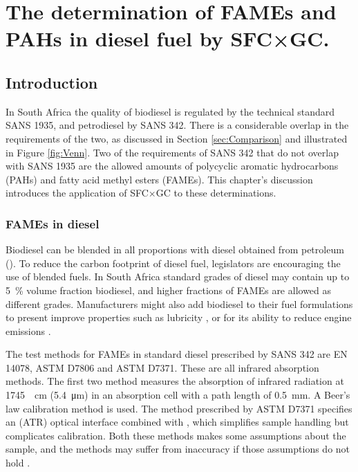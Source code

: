 
\begin{savequote}[\quotewidth]

\end{savequote}

\chapter{The determination of FAMEs and PAHs in diesel fuel by SFC×GC.} %
\label{Chapter7} %

\section{Introduction}

In South Africa the quality of biodiesel is regulated by the technical standard
SANS 1935, and petrodiesel by SANS 342. There is a considerable overlap in the
requirements of the two, as discussed in Section \ref{sec:Comparison} and
illustrated in Figure \ref{fig:Venn}. Two of the requirements of SANS 342 that
do not overlap with SANS 1935 are the allowed amounts of polycyclic aromatic
hydrocarbons (PAHs) and fatty acid methyl esters (FAMEs). This chapter's
discussion introduces the application of SFC×GC to these determinations.

\subsection{FAMEs in diesel}

Biodiesel can be blended in all proportions with diesel obtained from petroleum
(). To reduce the carbon footprint of diesel fuel,
legislators are encouraging the use of blended fuels. In South Africa standard
grades of diesel may contain up to \SI{5}{\percent} volume fraction biodiesel,
and higher fractions of FAMEs are allowed as different grades. Manufacturers
might also add biodiesel to their fuel formulations to present improve
properties such as lubricity \autocite{Knothe2005}, or for its ability to reduce
engine emissions \autocite{Wattrus2016}.

The test methods for FAMEs in standard diesel prescribed by SANS 342 are EN
14078, ASTM D7806 and ASTM D7371. These are all infrared absorption methods. The
first two method measures the absorption of infrared radiation at
\SI{1745}{\per\centi\metre} (\SI{5.4}{\micro\metre}) in an absorption cell with
a path length of \SI{0.5}{\milli\metre}. A Beer's law calibration method is
used. The method prescribed by ASTM D7371 specifies an  (ATR) optical interface combined with , which simplifies sample handling but complicates calibration. Both
these methods makes some assumptions about the sample, and the methods may
suffer from inaccuracy if those assumptions do not hold \autocite{Pinho2014}.

